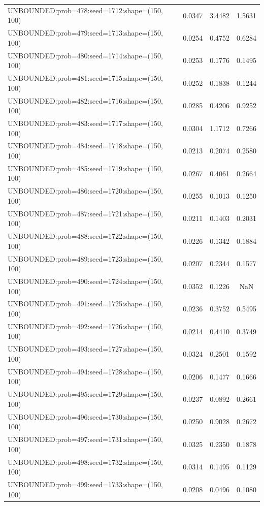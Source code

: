 \begin{longtable}{lccc}
UNBOUNDED:prob=478:seed=1712:shape=(150, 100) &   0.0347 &  3.4482 &  1.5631 \\
UNBOUNDED:prob=479:seed=1713:shape=(150, 100) &   0.0254 &  0.4752 &  0.6284 \\
UNBOUNDED:prob=480:seed=1714:shape=(150, 100) &   0.0253 &  0.1776 &  0.1495 \\
UNBOUNDED:prob=481:seed=1715:shape=(150, 100) &   0.0252 &  0.1838 &  0.1244 \\
UNBOUNDED:prob=482:seed=1716:shape=(150, 100) &   0.0285 &  0.4206 &  0.9252 \\
UNBOUNDED:prob=483:seed=1717:shape=(150, 100) &   0.0304 &  1.1712 &  0.7266 \\
UNBOUNDED:prob=484:seed=1718:shape=(150, 100) &   0.0213 &  0.2074 &  0.2580 \\
UNBOUNDED:prob=485:seed=1719:shape=(150, 100) &   0.0267 &  0.4061 &  0.2664 \\
UNBOUNDED:prob=486:seed=1720:shape=(150, 100) &   0.0255 &  0.1013 &  0.1250 \\
UNBOUNDED:prob=487:seed=1721:shape=(150, 100) &   0.0211 &  0.1403 &  0.2031 \\
UNBOUNDED:prob=488:seed=1722:shape=(150, 100) &   0.0226 &  0.1342 &  0.1884 \\
UNBOUNDED:prob=489:seed=1723:shape=(150, 100) &   0.0207 &  0.2344 &  0.1577 \\
UNBOUNDED:prob=490:seed=1724:shape=(150, 100) &   0.0352 &  0.1226 &     NaN \\
UNBOUNDED:prob=491:seed=1725:shape=(150, 100) &   0.0236 &  0.3752 &  0.5495 \\
UNBOUNDED:prob=492:seed=1726:shape=(150, 100) &   0.0214 &  0.4410 &  0.3749 \\
UNBOUNDED:prob=493:seed=1727:shape=(150, 100) &   0.0324 &  0.2501 &  0.1592 \\
UNBOUNDED:prob=494:seed=1728:shape=(150, 100) &   0.0206 &  0.1477 &  0.1666 \\
UNBOUNDED:prob=495:seed=1729:shape=(150, 100) &   0.0237 &  0.0892 &  0.2661 \\
UNBOUNDED:prob=496:seed=1730:shape=(150, 100) &   0.0250 &  0.9028 &  0.2672 \\
UNBOUNDED:prob=497:seed=1731:shape=(150, 100) &   0.0325 &  0.2350 &  0.1878 \\
UNBOUNDED:prob=498:seed=1732:shape=(150, 100) &   0.0314 &  0.1495 &  0.1129 \\
UNBOUNDED:prob=499:seed=1733:shape=(150, 100) &   0.0208 &  0.0496 &  0.1080 \\

\end{longtable}
